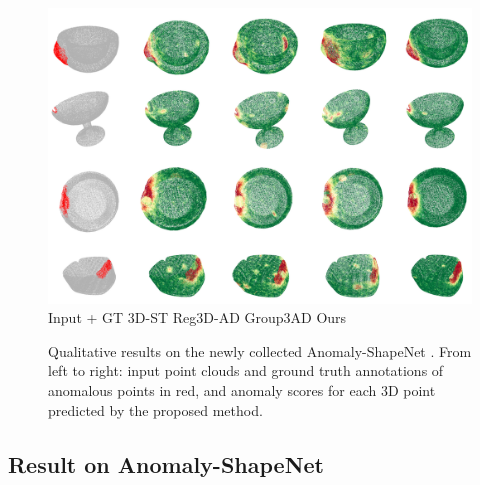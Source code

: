 \begin{figure}[!ht]
    \includegraphics[width=\linewidth]{figs/shapenet}  
    Input + GT \hspace{1.2cm} 3D-ST \cite{bergmann2023anomaly} \hspace{1.3cm} Reg3D-AD \cite{liu2023real3d} \hspace{1.5cm} Group3AD   \cite{zhu2024towards} \hspace{1.7cm} Ours \hspace{0.8cm}
    \caption{Qualitative results on the newly collected Anomaly-ShapeNet \cite{li2024towards}. From left to right: input point clouds and ground truth annotations of anomalous points in red, and anomaly scores for each 3D point predicted by the proposed method.}
    \label{fig:shapenet}
\end{figure}

\subsection{Result on Anomaly-ShapeNet}



